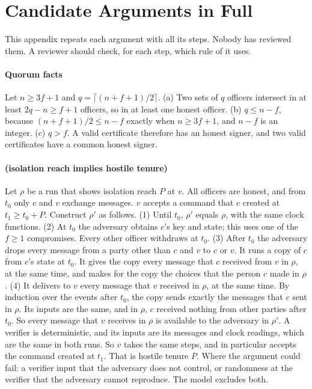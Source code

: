\section{Candidate Arguments in Full}
\label{app:arguments}

This appendix repeats each argument with all its steps. Nobody has reviewed them. A
reviewer should check, for each step, which rule of  it uses.

\paragraph{Quorum facts}
Let $n \ge 3f + 1$ and $q = \lceil (n + f + 1)/2 \rceil$. (a) Two sets of $q$ officers
intersect in at least $2q - n \ge f + 1$ officers, so in at least one honest officer.
(b) $q \le n - f$, because $(n + f + 1)/2 \le n - f$ exactly when $n \ge 3f + 1$, and
$n - f$ is an integer. (c) $q > f$. A valid certificate therefore has an honest
signer, and two valid certificates have a common honest signer.

\paragraph{ (isolation reach implies hostile tenure)}
Let $\rho$ be a run that shows isolation reach $P$ at $v$. All officers are honest, and
from $t_0$ only $c$ and $v$ exchange messages. $v$ accepts a command that $c$ created at
$t_1 \ge t_0 + P$. Construct $\rho'$ as follows. (1) Until $t_0$, $\rho'$ equals $\rho$,
with the same clock functions. (2) At $t_0$ the adversary obtains $c$'s key and state; this
uses one of the $f \ge 1$ compromises. Every other officer withdraws at $t_0$. (3) After
$t_0$ the adversary drops every message from a party other than $c$ and $v$ to $c$ or $v$.
It runs a copy of $c$ from $c$'s state at $t_0$. It gives the copy every message that $c$
received from $v$ in $\rho$, at the same time, and makes for the copy the choices that the
person $c$ made in $\rho$. (4) It delivers to $v$ every message that $v$ received in
$\rho$, at the same time. By induction over the events after $t_0$, the copy sends
exactly the messages that $c$ sent in $\rho$. Its inputs are the same, and in $\rho$, $c$
received nothing from other parties after $t_0$. So every message that $v$ receives in
$\rho$ is available to the adversary in $\rho'$. A verifier is deterministic, and its
inputs are its messages and clock readings, which are the same in both runs. So $v$ takes
the same steps, and in particular accepts the command created at $t_1$. That is hostile
tenure $P$. Where the argument could fail: a verifier input that the adversary does not
control, or randomness at the verifier that the adversary cannot reproduce. The model
excludes both.

